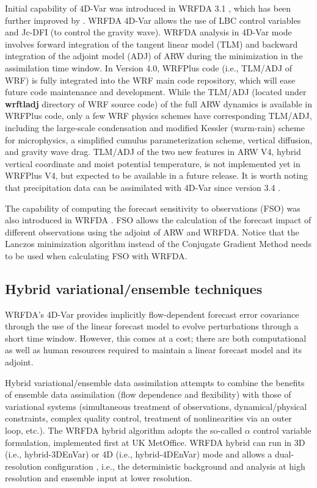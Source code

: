 Initial capability of 4D-Var was introduced in WRFDA 3.1 \citep{huang09}, which has been further
improved by \citet{zhang13, zhang14a}. WRFDA 4D-Var allows the use of LBC control variables and Jc-DFI 
(to control the gravity wave). WRFDA analysis in 4D-Var mode involves forward integration of the
tangent linear model (TLM) and backward integration of the adjoint model (ADJ) of ARW during the minimization in the assimilation time window. 
In Version 4.0, WRFPlus code (i.e., TLM/ADJ of WRF) is fully integrated into the WRF main code repository, 
which will ease future code maintenance
and development. While the TLM/ADJ (located under {\bf wrftladj} directory of WRF source code) of the full 
ARW dynamics is available in WRFPlus code, only a few WRF physics schemes have corresponding TLM/ADJ, including
the large-scale condensation and modified Kessler (warm-rain) \citep{wang13b} scheme for microphysics, a simplified
cumulus parameterization scheme, vertical diffusion, and gravity wave drag. TLM/ADJ of the two new features in ARW V4, 
hybrid vertical coordinate and moist potential temperature, is not implemented yet in WRFPlus V4, but expected to
be available in a future release.
It is worth noting that precipitation data can be assimilated with 4D-Var since version 3.4 \citep{ban17}.

The capability of computing the forecast sensitivity to observations (FSO) was also introduced in WRFDA \citep{zhang15}. 
FSO allows the calculation of the forecast impact of different observations using the adjoint of ARW and WRFDA. 
Notice that the Lanczos minimization algorithm instead of the Conjugate Gradient Method needs to be used when calculating FSO
with WRFDA.

\subsection{Hybrid variational/ensemble techniques}

WRFDA's 4D-Var provides implicitly flow-dependent forecast error covariance
through the use of the linear forecast model to evolve perturbations through a short time window. 
However, this comes at a cost; there are both computational as well as human resources
required to maintain a linear forecast model and its adjoint. 

Hybrid variational/ensemble data assimilation attempts to combine the benefits of ensemble data assimilation 
(flow dependence and flexibility) with those of variational systems (simultaneous treatment of observations,
dynamical/physical constraints, complex quality control, treatment of nonlinearities via an outer
loop, etc.). The WRFDA hybrid algorithm \citep{wang08a, wang08b} adopts the so-called $\alpha$ control variable formulation, 
implemented first at UK MetOffice. WRFDA hybrid can run in 3D (i.e., hybrid-3DEnVar) or 
4D (i.e., hybrid-4DEnVar) mode and allows a dual-resolution configuration \citep{schwartz15}, i.e., the deterministic
background and analysis at high resolution and ensemble input at lower resolution. 

